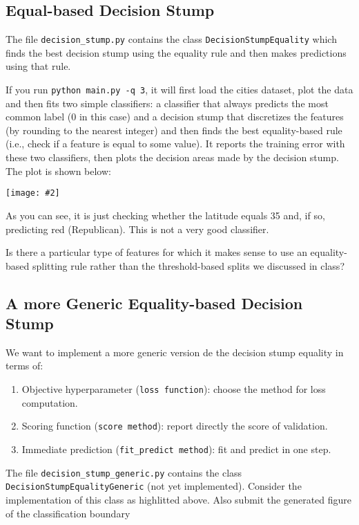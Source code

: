 \documentclass{article}
\def\blu#1{{\color{blu}#1}}
\newcommand{\centerfig}[2]{\begin{center}\texttt{[image: \#2]}\end{center}}
\begin{document}
\subsection{Equal-based Decision Stump}
The file \texttt{decision\string_stump.py} contains the class \texttt{DecisionStumpEquality} which 
finds the best decision stump using the equality rule and then makes predictions using that
rule.

If you run \texttt{python main.py -q 3}, it will first load the cities dataset, plot the data 
and then fits two simple classifiers: a classifier that always predicts the
most common label ($0$ in this case) and a decision stump that discretizes the features 
(by rounding to the nearest integer) and then finds the best equality-based rule (i.e., check
 if a feature is equal to some value).
It reports the training error with these two classifiers, then plots the decision areas 
made by the decision stump. The plot is shown below:

\centerfig{0.7}{../figs/q6_decisionBoundary}

As you can see, it is just checking whether the latitude equals 35 and, if so, 
predicting red (Republican).
This is not a very good classifier. 

\blu{ Is there a particular type of features for which it makes sense to use an 
equality-based splitting rule rather than the threshold-based splits we discussed in class?}

\subsection{A more Generic Equality-based Decision Stump}

We want to implement a more generic version de the decision stump equality in terms of:
\begin{enumerate}
    \item Objective hyperparameter (\texttt{loss function}): choose the method for loss computation.
    \item Scoring function (\texttt{score method}): report directly the score of validation.
    \item Immediate prediction (\texttt{fit\_predict method}): fit and predict in one step.
\end{enumerate}

The file \texttt{decision\_stump\_generic.py} contains the class \texttt{DecisionStumpEqualityGeneric} (not yet implemented).
\blu{Consider the implementation of this class as highlitted above.  Also submit the generated figure of the classification boundary}
\end{document}
